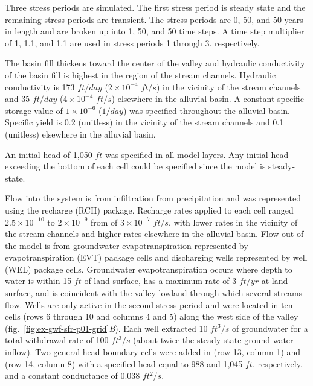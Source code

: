 Three stress periods are simulated. The first stress period is steady state and the remaining stress periods are transient. The stress periods are 0, 50, and 50 years in length and are broken up into 1, 50, and 50 time steps. A time step multiplier of 1, 1.1, and 1.1 are used in stress periods 1 through 3. respectively.



The basin fill thickens toward the center of the valley and hydraulic conductivity of the basin fill is highest in the region of the stream channels. Hydraulic conductivity is 173 $ft/day$ ($2 \times 10^{-4}$ $ft/s$) in the vicinity of the stream channels and 35 $ft/day$ ($4 \times 10^{-4}$ $ft/s$) elsewhere in the alluvial basin. A constant specific storage value of $1 \times 10^{-6}$ ($1/day$) was specified throughout the alluvial basin. Specific yield is 0.2 (unitless) in the vicinity of the stream channels and 0.1 (unitless) elsewhere in the alluvial basin.

An initial head of 1,050 $ft$ was specified in all model layers. Any initial head exceeding the bottom of each cell could be specified since the model is steady-state.

Flow into the system is from infiltration from precipitation and was represented using the recharge (RCH) package. Recharge rates applied to each cell ranged $2.5 \times 10^{-10}$ to $2 \times 10^{-9}$ from  of $3 \times 10^{-7}$ $ft/s$, with lower rates in the vicinity of the stream channels and higher rates elsewhere in the alluvial basin. Flow out of the model is from groundwater evapotranspiration represented by evapotranspiration (EVT) package cells and discharging wells represented by well (WEL) package cells. Groundwater evapotranspiration occurs where depth to water is within 15 $ft$ of land surface, has a maximum rate of 3 $ft/yr$ at land surface, and is coincident with the valley lowland through which several streams flow. Wells are only active in the second stress period and were located in ten cells (rows 6 through 10 and columns 4 and 5) along the west side of the valley (fig.~\ref{fig:ex-gwf-sfr-p01-grid}\textit{B}). Each well extracted 10 $ft^{3}/s$ of groundwater for a total withdrawal rate of 100 $ft^{3}/s$ (about twice the steady-state ground-water inflow). Two general-head boundary cells were added in (row 13, column 1) and (row 14, column 8) with a specified head equal to 988 and 1,045 $ft$, respectively, and a constant conductance of 0.038 $ft^{2}/s$.

